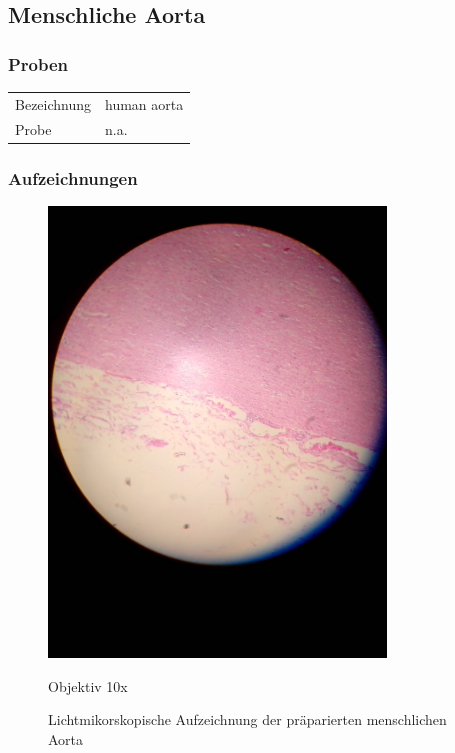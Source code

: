 \newpage
\subsection{Menschliche Aorta}

\subsubsection{Proben}
\begin{table}[h!]
	\centering
	\begin{tabular}{l l}
		Bezeichnung	& human aorta \\
		Probe 		& n.a.
	\end{tabular}
\end{table}

\subsubsection{Aufzeichnungen}
\begin{figure}[h!]
	\centering
		\includegraphics[angle=270, width=0.8\textwidth]{../images/01_aorta.jpg}
		\caption{Objektiv 10x}
	\caption{Lichtmikorskopische Aufzeichnung der präparierten
		menschlichen Aorta}
\end{figure}

